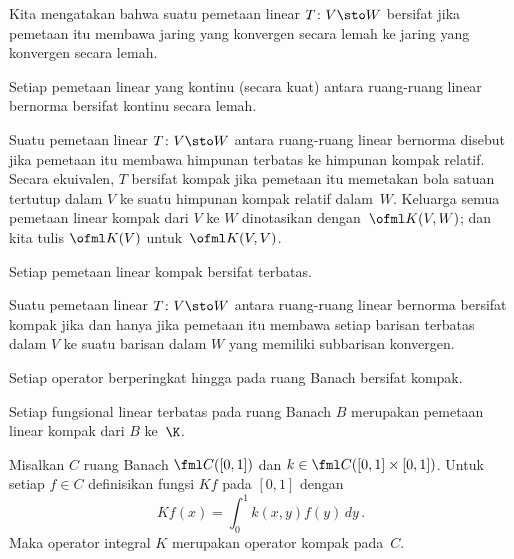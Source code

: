 \begin{defn} Kita mengatakan bahwa suatu pemetaan linear $T\colon V \sto W$ bersifat
 jika pemetaan itu membawa jaring yang konvergen secara lemah ke jaring yang konvergen secara lemah.
\end{defn}

\begin{prop} Setiap pemetaan linear yang kontinu (secara kuat) antara ruang-ruang linear bernorma bersifat kontinu secara lemah.
\end{prop}

\begin{defn} Suatu pemetaan linear $T\colon V \sto W$ antara ruang-ruang linear bernorma disebut
 jika pemetaan itu membawa himpunan terbatas ke himpunan kompak relatif. Secara ekuivalen, $T$ bersifat kompak jika pemetaan itu
memetakan bola satuan tertutup dalam $V$ ke suatu himpunan kompak relatif dalam~$W$.   Keluarga semua pemetaan linear kompak
dari $V$ ke $W$ dinotasikan
dengan~$\ofml K(V,W)$; dan kita tulis $\ofml K(V)$ untuk~$\ofml K(V,V)$.
\end{defn}

\begin{prop} Setiap pemetaan linear kompak bersifat terbatas.
\end{prop}

\begin{prop} Suatu pemetaan linear $T\colon V \sto W$ antara ruang-ruang linear bernorma bersifat kompak jika dan hanya jika pemetaan itu membawa
setiap barisan terbatas dalam $V$ ke suatu barisan dalam $W$ yang memiliki subbarisan konvergen.
\end{prop}

\begin{exam} Setiap operator berperingkat hingga pada ruang Banach bersifat kompak.
\end{exam}

\begin{exam} Setiap fungsional linear terbatas pada ruang Banach $B$ merupakan pemetaan linear kompak dari $B$ ke~$\K$.
\end{exam}

\begin{exam} Misalkan $C$ ruang Banach $\fml C([0,1])$ dan $k \in \fml C([0,1] \times [0,1])$.  Untuk setiap $f \in C$
definisikan fungsi $Kf$ pada $[0,1]$ dengan
   \[ Kf(x) = \int_0^1 k(x,y)f(y)\,dy\,. \]
Maka operator integral $K$ merupakan operator kompak pada~$C$.
\end{exam}

